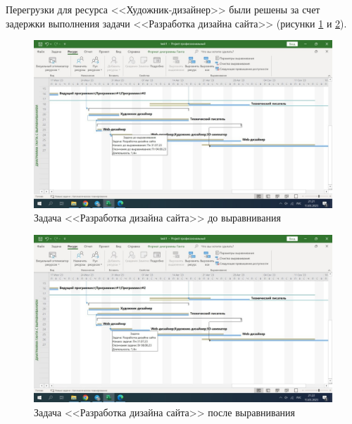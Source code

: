 Перегрузки для ресурса <<Художник-дизайнер>> были решены за счет задержки выполнения задачи <<Разработка дизайна сайта>> (рисунки \ref{img:task1-designer-before} и \ref{img:task1-designer-after}).

\begin{figure}[H]
	\begin{center}
		\includegraphics[scale=0.3]{inc/img/task1-designer-before.jpg}
	\end{center}
	\captionsetup{justification=centering}
	\caption{Задача <<Разработка дизайна сайта>> до выравнивания}
	\label{img:task1-designer-before}
\end{figure}

\begin{figure}[H]
	\begin{center}
		\includegraphics[scale=0.3]{inc/img/task1-designer-after.jpg}
	\end{center}
	\captionsetup{justification=centering}
	\caption{Задача <<Разработка дизайна сайта>> после выравнивания}
	\label{img:task1-designer-after}
\end{figure}

